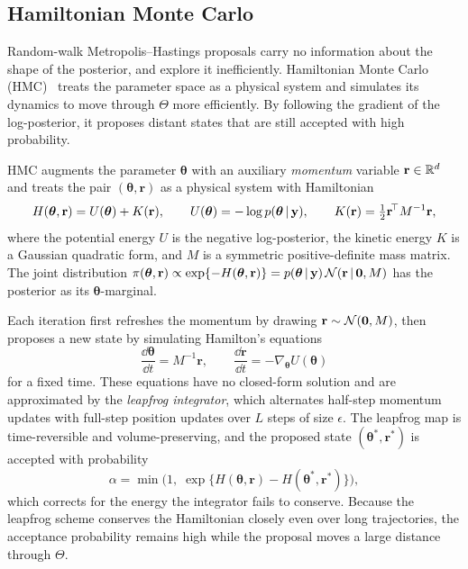 \iffalse
\subsection{Hamiltonian Monte Carlo}
\label{sec:hmc}

Random-walk Metropolis--Hastings proposals carry no information about
the shape of the posterior, and explore it inefficiently. Hamiltonian
Monte Carlo (HMC)~\citep{neal2011mcmc, betancourt2017hmc} treats the
parameter space as a physical system and simulates its dynamics to move
through $\Theta$ more efficiently. By following the gradient of the
log-posterior, it proposes distant states that are still accepted with
high probability.

HMC augments the parameter $\bm{\theta}$ with an auxiliary
\emph{momentum} variable $\mathbf{r} \in \mathbb{R}^d$ and treats the pair
$(\bm{\theta}, \mathbf{r})$ as a physical system with Hamiltonian
%
\begin{equation}
  H(\bm{\theta}, \mathbf{r}) = U(\bm{\theta}) + K(\mathbf{r}),
  \qquad
  U(\bm{\theta}) = -\log p(\bm{\theta} \,|\, \mathbf{y}),
  \qquad
  K(\mathbf{r}) = \tfrac{1}{2}\mathbf{r}^{\!\top} M^{-1} \mathbf{r},
  \label{eq:hamiltonian}
\end{equation}
%
where the potential energy $U$ is the negative log-posterior, the
kinetic energy $K$ is a Gaussian quadratic form, and $M$ is a
symmetric positive-definite mass matrix. The joint distribution
$\pi(\bm{\theta}, \mathbf{r}) \propto \exp\{-H(\bm{\theta},
\mathbf{r})\} = p(\bm{\theta} \,|\, \mathbf{y})\,
\mathcal{N}(\mathbf{r} \,|\, \mathbf{0}, M)$ has the posterior as its
$\bm{\theta}$-marginal.

Each iteration first refreshes the momentum by drawing
$\mathbf{r} \sim \mathcal{N}(\mathbf{0}, M)$, then proposes a new state by
simulating Hamilton's equations
%
\begin{equation}
  \frac{\dd \bm{\theta}}{\dd t} = M^{-1}\mathbf{r},
  \qquad
  \frac{\dd \mathbf{r}}{\dd t} = -\nabla_{\bm{\theta}}
  U(\bm{\theta})
  \label{eq:hamiltons-equations}
\end{equation}
%
for a fixed time. These equations have no closed-form solution and are
approximated by the \emph{leapfrog integrator}, which alternates
half-step momentum updates with full-step position updates over $L$
steps of size $\epsilon$. The leapfrog map is time-reversible and
volume-preserving, and the proposed state $(\bm{\theta}^{*},
\mathbf{r}^{*})$ is accepted with probability
%
\begin{equation}
  \alpha = \min\!\big(1,\;
  \exp\{H(\bm{\theta}, \mathbf{r})
  - H(\bm{\theta}^{*}, \mathbf{r}^{*})\}\big),
  \label{eq:hmc-acceptance}
\end{equation}
%
which corrects for the energy the integrator fails to conserve.
Because the leapfrog scheme conserves the Hamiltonian closely even
over long trajectories, the acceptance probability remains high while
the proposal moves a large distance through $\Theta$.

